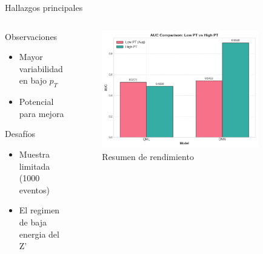 \documentclass[aspectratio=169]{beamer}
\begin{document}
\begin{frame}{Hallazgos principales}
  \begin{columns}
    \begin{column}{0.43\textwidth}
      \begin{block}{Observaciones}
        \begin{itemize}
          \item Mayor variabilidad en bajo \texorpdfstring{$p_T$}{pT}
          \item Potencial para mejora
        \end{itemize}
      \end{block}
      \vspace{-0.3em}
      \begin{alertblock}{Desafíos}
        \begin{itemize}
          \item Muestra limitada (1000 eventos)
          \item El regimen de baja energia del Z'
        \end{itemize}
      \end{alertblock}
    \end{column}
    \begin{column}{0.55\textwidth}
      \vspace{-0.3em}
      \begin{figure}
        \includegraphics[width=0.85\textwidth]{resumen_hmmm/auc_low_vs_high_pt.png}
        \caption{\footnotesize Resumen de rendimiento}
      \end{figure}
    \end{column}
  \end{columns}
\end{frame}
\end{document}
